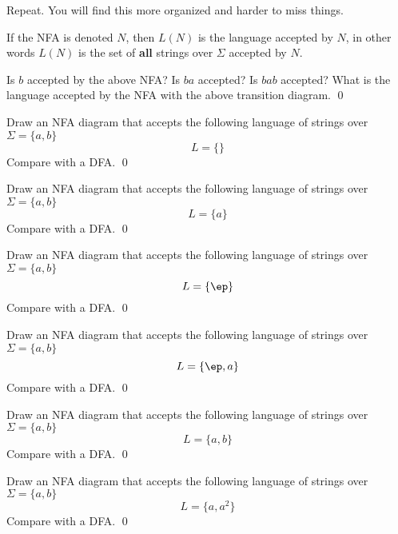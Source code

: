 Repeat. You will find this more organized and harder to miss things.






\begin{defn}
If the NFA is denoted $N$, then $L(N)$ is the language accepted by
$N$, in other words $L(N)$ is the set of \textbf{all} strings over
$\Sigma$ accepted by $N$.
\end{defn}

\newpage
\begin{ex}
Is $b$ accepted by the above NFA? Is $ba$ accepted? Is $bab$
accepted? What is the language accepted by the NFA with the above
transition diagram.
\qed
\end{ex}

\newpage
\begin{ex}
Draw an NFA diagram that accepts the following
language of strings over $\Sigma =
\{ a, b \}$ 
\[
L = \{\}
\]
Compare with a DFA.
\qed
\end{ex}


\newpage
\begin{ex}
Draw an NFA diagram that accepts the following
language of strings over $\Sigma =
\{ a, b \}$ 
\[
L = \{a\}
\]
Compare with a DFA.
\qed
\end{ex}


\newpage
\begin{ex}
Draw an NFA diagram that accepts the following
language of strings over $\Sigma =
\{ a, b \}$ 
\[
L = \{\ep\}
\]
Compare with a DFA.
\qed
\end{ex}


\newpage
\begin{ex}
Draw an NFA diagram that accepts the following
language of strings over $\Sigma =
\{ a, b \}$ 
\[
L = \{\ep, a\}
\]
Compare with a DFA.
\qed
\end{ex}


\newpage
\begin{ex}
Draw an NFA diagram that accepts the following
language of strings over $\Sigma =
\{ a, b \}$ 
\[
L = \{a, b\}
\]
Compare with a DFA.
\vspace{2in}
\qed
\end{ex}


\newpage
\begin{ex}
Draw an NFA diagram that accepts the following
language of strings over $\Sigma =
\{ a, b \}$ 
\[
L = \{a, a^2\}
\]
Compare with a DFA.
\vspace{2in}
\qed
\end{ex}


